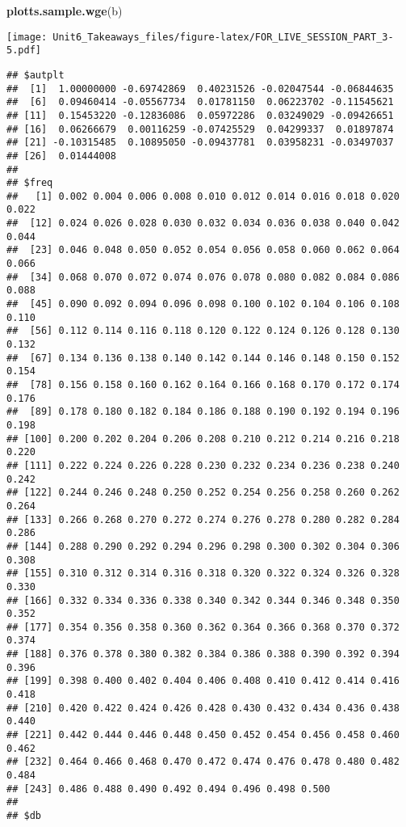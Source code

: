 \documentclass[]{article}
\newenvironment{Shaded}{\begin{snugshade}}{\end{snugshade}}
\newcommand{\KeywordTok}[1]{\textcolor[rgb]{0.13,0.29,0.53}{\textbf{#1}}}
\newcommand{\NormalTok}[1]{#1}
\begin{document}
\begin{Shaded}
\begin{Highlighting}[]
\KeywordTok{plotts.sample.wge}\NormalTok{(b)}
\end{Highlighting}
\end{Shaded}

\texttt{[image: Unit6\_Takeaways\_files/figure-latex/FOR\_LIVE\_SESSION\_PART\_3-5.pdf]}

\begin{verbatim}
## $autplt
##  [1]  1.00000000 -0.69742869  0.40231526 -0.02047544 -0.06844635
##  [6]  0.09460414 -0.05567734  0.01781150  0.06223702 -0.11545621
## [11]  0.15453220 -0.12836086  0.05972286  0.03249029 -0.09426651
## [16]  0.06266679  0.00116259 -0.07425529  0.04299337  0.01897874
## [21] -0.10315485  0.10895050 -0.09437781  0.03958231 -0.03497037
## [26]  0.01444008
## 
## $freq
##   [1] 0.002 0.004 0.006 0.008 0.010 0.012 0.014 0.016 0.018 0.020 0.022
##  [12] 0.024 0.026 0.028 0.030 0.032 0.034 0.036 0.038 0.040 0.042 0.044
##  [23] 0.046 0.048 0.050 0.052 0.054 0.056 0.058 0.060 0.062 0.064 0.066
##  [34] 0.068 0.070 0.072 0.074 0.076 0.078 0.080 0.082 0.084 0.086 0.088
##  [45] 0.090 0.092 0.094 0.096 0.098 0.100 0.102 0.104 0.106 0.108 0.110
##  [56] 0.112 0.114 0.116 0.118 0.120 0.122 0.124 0.126 0.128 0.130 0.132
##  [67] 0.134 0.136 0.138 0.140 0.142 0.144 0.146 0.148 0.150 0.152 0.154
##  [78] 0.156 0.158 0.160 0.162 0.164 0.166 0.168 0.170 0.172 0.174 0.176
##  [89] 0.178 0.180 0.182 0.184 0.186 0.188 0.190 0.192 0.194 0.196 0.198
## [100] 0.200 0.202 0.204 0.206 0.208 0.210 0.212 0.214 0.216 0.218 0.220
## [111] 0.222 0.224 0.226 0.228 0.230 0.232 0.234 0.236 0.238 0.240 0.242
## [122] 0.244 0.246 0.248 0.250 0.252 0.254 0.256 0.258 0.260 0.262 0.264
## [133] 0.266 0.268 0.270 0.272 0.274 0.276 0.278 0.280 0.282 0.284 0.286
## [144] 0.288 0.290 0.292 0.294 0.296 0.298 0.300 0.302 0.304 0.306 0.308
## [155] 0.310 0.312 0.314 0.316 0.318 0.320 0.322 0.324 0.326 0.328 0.330
## [166] 0.332 0.334 0.336 0.338 0.340 0.342 0.344 0.346 0.348 0.350 0.352
## [177] 0.354 0.356 0.358 0.360 0.362 0.364 0.366 0.368 0.370 0.372 0.374
## [188] 0.376 0.378 0.380 0.382 0.384 0.386 0.388 0.390 0.392 0.394 0.396
## [199] 0.398 0.400 0.402 0.404 0.406 0.408 0.410 0.412 0.414 0.416 0.418
## [210] 0.420 0.422 0.424 0.426 0.428 0.430 0.432 0.434 0.436 0.438 0.440
## [221] 0.442 0.444 0.446 0.448 0.450 0.452 0.454 0.456 0.458 0.460 0.462
## [232] 0.464 0.466 0.468 0.470 0.472 0.474 0.476 0.478 0.480 0.482 0.484
## [243] 0.486 0.488 0.490 0.492 0.494 0.496 0.498 0.500
## 
## $db

\end{verbatim}
\end{document}

